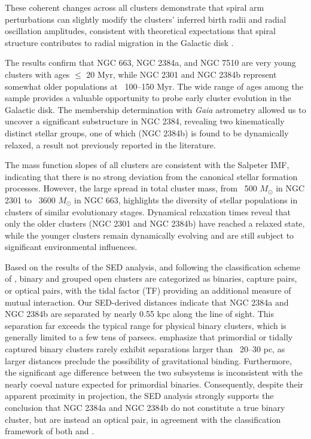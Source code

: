 \documentclass[referee]{raa}            %
\begin{document}
These coherent changes across all clusters demonstrate that spiral arm perturbations can slightly modify the clusters' inferred birth radii and radial oscillation amplitudes, consistent with theoretical expectations that spiral structure contributes to radial migration in the Galactic disk \citep{Sellwood2002, MartinezMedina2015}.

The results confirm that NGC 663, NGC 2384a, and NGC 7510 are very young clusters with ages $\le$ 20 Myr, while NGC 2301 and NGC 2384b represent somewhat older populations at ~100–150 Myr. The wide range of ages among the sample provides a valuable opportunity to probe early cluster evolution in the Galactic disk. The membership determination with \textit{Gaia} astrometry allowed us to uncover a significant substructure in NGC 2384, revealing two kinematically distinct stellar groups, one of which (NGC 2384b) is found to be dynamically relaxed, a result not previously reported in the literature.

The mass function slopes of all clusters are consistent with the Salpeter IMF, indicating that there is no strong deviation from the canonical stellar formation processes. However, the large spread in total cluster mass, from ~500 $M_{\odot}$ in NGC 2301 to ~3600 $M_{\odot}$ in NGC 663, highlights the diversity of stellar populations in clusters of similar evolutionary stages. Dynamical relaxation times reveal that only the older clusters (NGC 2301 and NGC 2384b) have reached a relaxed state, while the younger clusters remain dynamically evolving and are still subject to significant environmental influences.

Based on the results of the SED analysis, and following the classification scheme of \citet{Palma2024}, binary and grouped open clusters are categorized as binaries, capture pairs, or optical pairs, with the tidal factor (TF) providing an additional measure of mutual interaction. Our SED-derived distances indicate that NGC 2384a and NGC 2384b are separated by nearly 0.55 kpc along the line of sight. This separation far exceeds the typical range for physical binary clusters, which is generally limited to a few tens of parsecs. \citet{Delafauntemarcos2009} emphasize that primordial or tidally captured binary clusters rarely exhibit separations larger than ~20–30 pc, as larger distances preclude the possibility of gravitational binding. Furthermore, the significant age difference between the two subsystems is inconsistent with the nearly coeval nature expected for primordial binaries. Consequently, despite their apparent proximity in projection, the SED analysis strongly supports the conclusion that NGC 2384a and NGC 2384b do not constitute a true binary cluster, but are instead an optical pair, in agreement with the classification framework of both \citet{Palma2024} and \citet{Delafauntemarcos2009}.
\end{document}

